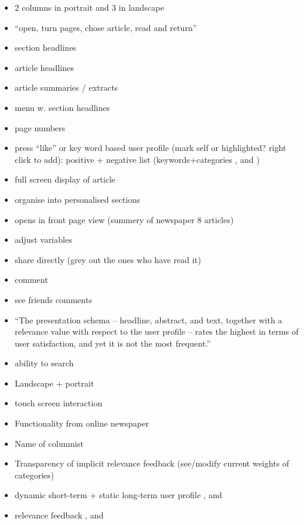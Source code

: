 \begin{itemize}
	\item 2 columns in portrait and 3 in landscape
	\item ``open, turn pages, chose article, read and return'' \cite[p. 6]{FULLTEXT01.pdf}
	\item section headlines \cite[p. 6-7]{kristin_fredrik.pdf}
	\item article headlines
	\item article summaries / extracts \cite{fulltext.pdf}
	\item menu w. section headlines \cite[p. 8]{kristin_fredrik.pdf}
	\item page numbers \cite[p. 6-7]{kristin_fredrik.pdf}
	\item press ``like'' or key word based user profile (mark self or highlighted? right click to add): positive + negative list (keywords+categories \cite{10-1-1-19-5583}, \cite{fulltext.pdf} and \cite{gervasum2001ws.pdf})
	\item full screen display of article
	\item organise into personalised sections
	\item opens in front page view (summery of newspaper 8 articles) \cite[p. 8]{kristin_fredrik.pdf}
	\item adjust variables
	\item share directly (grey out the ones who have read it)
	\item comment
	\item see friends comments
	\item ``The presentation schema -- headline, abstract, and text, together with a relevance value with respect to the user profile -- rates the highest in terms of user satisfaction, and yet it is not the most frequent.'' \cite{Sections-categories-and-keywords-as-interest-specification-tools-for-personalised-news-services.pdf}
	\item  ability to search \cite[p. 7]{FULLTEXT01.pdf}
	\item Landscape + portrait \cite[p. 6-7]{kristin_fredrik.pdf}
	\item touch screen interaction \cite[p. 6-7]{kristin_fredrik.pdf}
	\item Functionality from online newspaper \cite{hcii2005_1004.pdf}
	\item Name of columnist \cite[p. 4]{gervasum2001ws.pdf}
	\item Transparency of implicit relevance feedback (see/modify current weights of categories) \cite[p. 7]{gervasum2001ws.pdf}
	\item dynamic short-term + static long-term user profile \cite{10-1-1-19-5583}, \cite{fulltext.pdf} and \cite{gervasum2001ws.pdf}
	\item relevance feedback \cite{10-1-1-19-5583}, \cite{fulltext.pdf} and \cite{gervasum2001ws.pdf}
\end{itemize}


